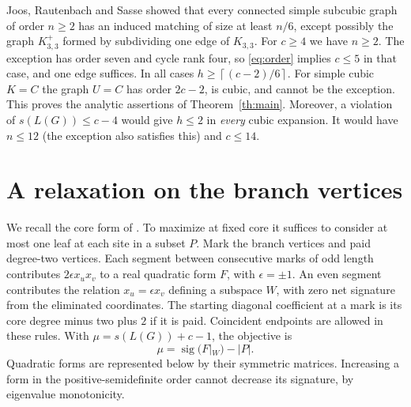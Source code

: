 \documentclass[11pt]{article}
\newcommand{\sig}{\operatorname{sig}}
\newcommand{\ceil}[1]{\left\lceil#1\right\rceil}
\begin{document}
Joos, Rautenbach and Sasse \cite[Theorem 2]{JRS} showed that every connected simple subcubic graph of order $n\ge2$ has an induced matching of size at least $n/6$, except possibly the graph $K_{3,3}^+$ formed by subdividing one edge of $K_{3,3}$. For $c\ge4$ we have $n\ge2$. The exception has order seven and cycle rank four, so \eqref{eq:order} implies $c\le5$ in that case, and one edge suffices. In all cases $h\ge\ceil{(c-2)/6}$. For simple cubic $K=C$ the graph $U=C$ has order $2c-2$, is cubic, and cannot be the exception. This proves the analytic assertions of Theorem~\ref{th:main}. Moreover, a violation of $s(L(G))\le c-4$ would give $h\le2$ in \emph{every} cubic expansion. It would have $n\le12$ (the exception also satisfies this) and $c\le14$.

\section{A relaxation on the branch vertices}
We recall the core form of \cite[Section 1]{finite}. To maximize at fixed core it suffices to consider at most one leaf at each site in a subset $P$. Mark the branch vertices and paid degree-two vertices. Each segment between consecutive marks of odd length contributes $2\epsilon x_u x_v$ to a real quadratic form $F$, with $\epsilon=\pm1$. An even segment contributes the relation $x_u=\epsilon x_v$ defining a subspace $W$, with zero net signature from the eliminated coordinates. The starting diagonal coefficient at a mark is its core degree minus two plus $2$ if it is paid. Coincident endpoints are allowed in these rules. With $\mu=s(L(G))+c-1$, the objective is
\[
 \mu=\sig(F|_W)-|P|.
\]
Quadratic forms are represented below by their symmetric matrices. Increasing a form in the positive-semidefinite order cannot decrease its signature, by eigenvalue monotonicity.
\end{document}
